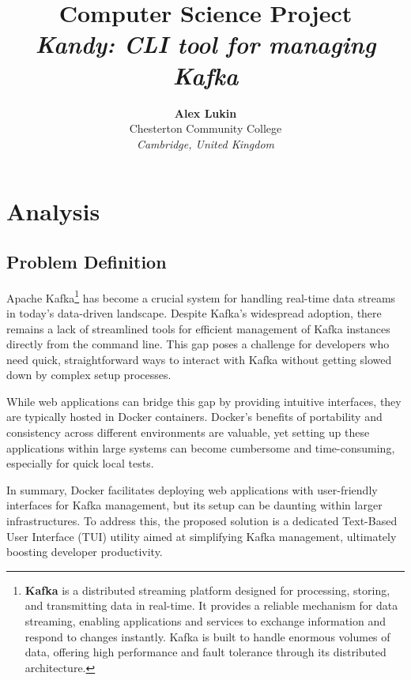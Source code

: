 \documentclass[10pt , a4paper]{report}
\begin{document}
\title{Computer Science Project\\
        \textit{Kandy: CLI tool for managing Kafka}}

\author{\textbf{Alex Lukin}\\
Chesterton Community College\\
\textit{Cambridge, United Kingdom}\\}


\maketitle

\newpage
\tableofcontents
\newpage

\chapter{Analysis}
\section{Problem Definition}

Apache Kafka\footnote{\textbf{Kafka} is a distributed streaming platform designed for processing, storing, and transmitting data in real-time. It provides a reliable mechanism for data streaming, enabling applications and services to exchange information and respond to changes instantly. Kafka is built to handle enormous volumes of data, offering high performance and fault tolerance through its distributed architecture.} has become a crucial system for handling real-time data streams in today’s data-driven landscape. Despite Kafka’s widespread adoption, there remains a lack of streamlined tools for efficient management of Kafka instances directly from the command line. This gap poses a challenge for developers who need quick, straightforward ways to interact with Kafka without getting slowed down by complex setup processes.

While web applications can bridge this gap by providing intuitive interfaces, they are typically hosted in Docker containers. Docker’s benefits of portability and consistency across different environments are valuable, yet setting up these applications within large systems can become cumbersome and time-consuming, especially for quick local tests.

In summary, Docker facilitates deploying web applications with user-friendly interfaces for Kafka management, but its setup can be daunting within larger infrastructures. To address this, the proposed solution is a dedicated Text-Based User Interface (TUI) utility aimed at simplifying Kafka management, ultimately boosting developer productivity.
\end{document}
